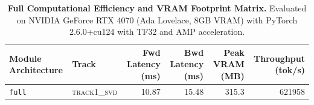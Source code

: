 \begin{table}[t]
\centering
\small
\caption{\textbf{Full Computational Efficiency and VRAM Footprint Matrix.} Evaluated on NVIDIA GeForce RTX 4070 (Ada Lovelace, 8GB VRAM) with PyTorch 2.6.0+cu124 with TF32 and AMP acceleration.}
\label{tab:efficiency_benchmark_results}
\begin{tabular}{l l r r r r}
\toprule
\textbf{Module Architecture} & \textbf{Track} & \textbf{Fwd Latency (ms)} & \textbf{Bwd Latency (ms)} & \textbf{Peak VRAM (MB)} & \textbf{Throughput (tok/s)} \\
\midrule
\texttt{full} & \textsc{track1\_svd} & 10.87 & 15.48 & 315.3 & 621958 \\
\bottomrule
\end{tabular}
\end{table}